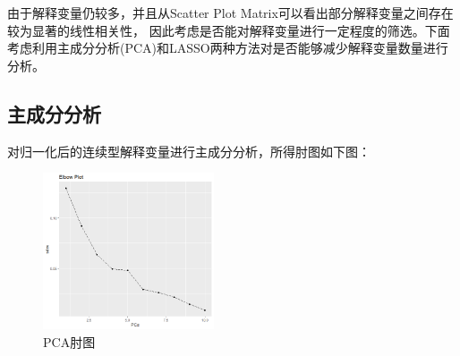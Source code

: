 \documentclass{ctexart}
\begin{document}
由于解释变量仍较多，并且从Scatter Plot Matrix可以看出部分解释变量之间存在较为显著的线性相关性，
因此考虑是否能对解释变量进行一定程度的筛选。下面考虑利用主成分分析(PCA)和LASSO两种方法对是否能够减少解释变量数量进行分析。

\subsection{主成分分析}
对归一化后的连续型解释变量进行主成分分析，所得肘图如下图：
\begin{figure}[H]
    \centering
    \includegraphics[width=0.45\textwidth]{EDA/PCA_elbow.png}
    \caption{PCA肘图}
\end{figure}
\end{document}
